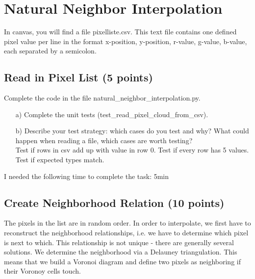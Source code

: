 \def\firstname{Tim}
\def\lastname{Dahmen}
\def\aufgabenblatt{2 and 3}




\thispagestyle{page1} 

\section{Natural Neighbor Interpolation}

In canvas, you will find a file pixelliste.csv. This text file contains one defined pixel value per line in the format x-position, y-position, r-value, g-value, b-value, each separated by a semicolon.

\subsection{Read in Pixel List (5 points)}

Complete the code in the file natural\_neighbor\_interpolation.py. 

\begin{enumerate}

\item[a)] Complete the unit tests (test\_read\_pixel\_cloud\_from\_csv).

\item[b)] Describe your test strategy: which cases do you test and why? What could happen when reading a file, which cases are worth testing?\\
Test if rows in csv add up with value in row 0. Test if every row has 5 values. Test if expected types match.

\end{enumerate}

I needed the following time to complete the task: 5min

\subsection{Create Neighborhood Relation (10 points)}

The pixels in the list are in random order. In order to interpolate, we first have to reconstruct the neighborhood relationships, i.e. we have to determine which pixel is next to which. This relationship is not unique - there are generally several solutions. We determine the neighborhood via a Delauney triangulation. This means that we build a Voronoi diagram and define two pixels as neighboring if their Voronoy cells touch. 

